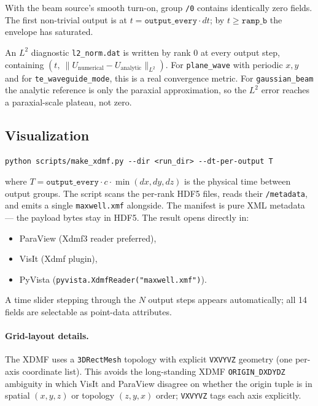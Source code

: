 \documentclass[11pt]{article}
\begin{document}
With the beam source's smooth turn-on, group \texttt{/0} contains
identically zero fields.  The first non-trivial output is at
$t = \mathtt{output\_every}\cdot dt$; by $t \geq \mathtt{ramp\_b}$
the envelope has saturated.

An $L^2$ diagnostic \texttt{l2\_norm.dat} is written by rank 0 at
every output step, containing
$(t,\ \|U_{\text{numerical}} - U_{\text{analytic}}\|_{L^2})$.
For \texttt{plane\_wave} with periodic $x, y$ and for
\texttt{te\_waveguide\_mode}, this is a real convergence metric.
For \texttt{gaussian\_beam} the analytic reference is only the
paraxial approximation, so the $L^2$ error reaches a paraxial-scale
plateau, not zero.

\subsection{Visualization}

\begin{lstlisting}[style=shell]
python scripts/make_xdmf.py --dir <run_dir> --dt-per-output T
\end{lstlisting}
where
$T = \mathtt{output\_every}\cdot c\cdot \min(dx, dy, dz)$ is the
physical time between output groups.  The script scans the
per-rank HDF5 files, reads their \texttt{/metadata}, and emits a
single \texttt{maxwell.xmf} alongside.  The manifest is pure XML
metadata --- the payload bytes stay in HDF5.  The result opens
directly in:
\begin{itemize}[itemsep=1pt,topsep=2pt]
  \item ParaView (Xdmf3 reader preferred),
  \item VisIt (Xdmf plugin),
  \item PyVista (\texttt{pyvista.XdmfReader("maxwell.xmf")}).
\end{itemize}
A time slider stepping through the $N$ output steps appears
automatically; all 14 fields are selectable as point-data
attributes.

\paragraph{Grid-layout details.}
The XDMF uses a \texttt{3DRectMesh} topology with explicit
\texttt{VXVYVZ} geometry (one per-axis coordinate list).  This
avoids the long-standing XDMF \texttt{ORIGIN\_DXDYDZ} ambiguity in
which VisIt and ParaView disagree on whether the origin tuple is
in spatial $(x, y, z)$ or topology $(z, y, x)$ order;
\texttt{VXVYVZ} tags each axis explicitly.
\end{document}
